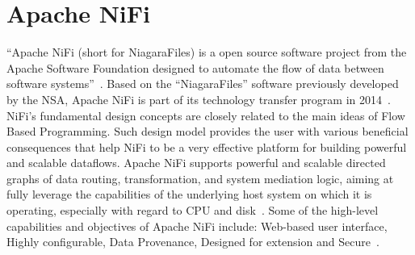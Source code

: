 \section{Apache NiFi}
``Apache NiFi (short for NiagaraFiles) is a open source software project from the Apache Software 
Foundation designed to automate the flow of data between software 
systems''~\cite{hid-sp18-405-wiki-nifi}. Based on the ``NiagaraFiles'' software previously developed by 
the NSA,  Apache NiFi is part of its technology transfer program in 2014~\cite{hid-sp18-405-wiki-nifi}. 
NiFi's fundamental design concepts are closely related to the main ideas of Flow Based Programming. 
Such design model provides the user with various beneficial consequences that help NiFi to be a very 
effective platform for building powerful and scalable dataflows. Apache NiFi supports powerful and 
scalable directed graphs of data routing, transformation, and system mediation logic, aiming at fully 
leverage the capabilities of the underlying host system on which it is operating, especially with regard 
to CPU and disk~\cite{hid-sp18-405-wwwoverview-nifi}. Some of the high-level capabilities and 
objectives of Apache NiFi include: Web-based user interface, Highly configurable, Data Provenance, 
Designed for extension and Secure~\cite{hid-sp18-405-www-nifi}.